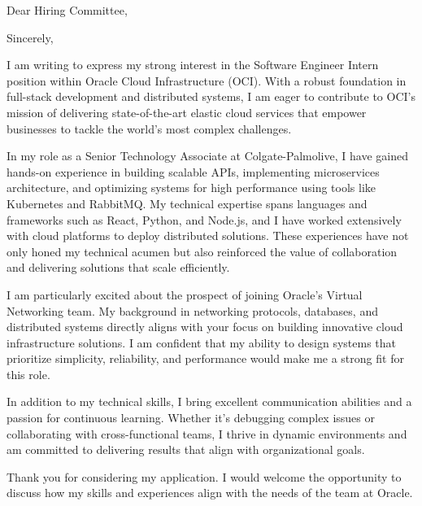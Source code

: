 \documentclass[11pt,a4paper,roman]{moderncv}
\begin{document}
\date{\today}
\opening{Dear Hiring Committee,}
\closing{Sincerely,}
\makelettertitle
I am writing to express my strong interest in the Software Engineer Intern position within 
Oracle Cloud Infrastructure (OCI). With a robust foundation in full-stack development and 
distributed systems, I am eager to contribute to OCI’s mission of delivering state-of-the-art 
elastic cloud services that empower businesses to tackle the world’s most complex challenges.

In my role as a Senior Technology Associate at Colgate-Palmolive, I have gained hands-on 
experience in building scalable APIs, implementing microservices architecture, and optimizing 
systems for high performance using tools like Kubernetes and RabbitMQ. My technical expertise 
spans languages and frameworks such as React, Python, and Node.js, and I have worked 
extensively with cloud platforms to deploy distributed solutions. These experiences 
have not only honed my technical acumen but also reinforced the value of collaboration 
and delivering solutions that scale efficiently.

I am particularly excited about the prospect of joining Oracle's Virtual Networking team. 
My background in networking protocols, databases, and distributed systems directly aligns 
with your focus on building innovative cloud infrastructure solutions. I am confident that 
my ability to design systems that prioritize simplicity, reliability, and performance 
would make me a strong fit for this role.

In addition to my technical skills, I bring excellent communication abilities and a passion 
for continuous learning. Whether it’s debugging complex issues or collaborating with 
cross-functional teams, I thrive in dynamic environments and am committed to delivering 
results that align with organizational goals.

Thank you for considering my application. I would welcome the opportunity to discuss how 
my skills and experiences align with the needs of the team at Oracle.
\vspace{0.5cm}

\makeletterclosing
\end{document}
